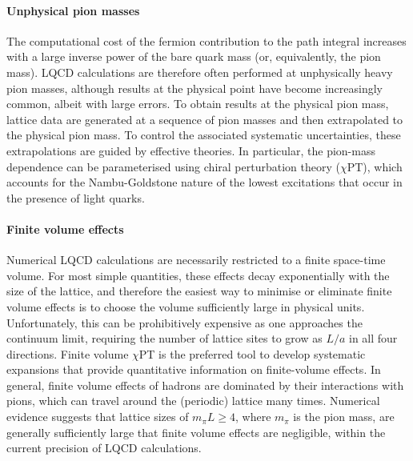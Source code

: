 \paragraph{Unphysical pion masses} 
The computational cost of the fermion contribution to the path
integral increases with a large inverse power of the bare quark mass
(or, equivalently, the pion mass). LQCD calculations are therefore
often performed at unphysically heavy pion masses, although results at
the physical point have become increasingly common, albeit with large
errors. To obtain results at the physical pion mass, lattice data are
generated at a sequence of pion masses and then extrapolated to the
physical pion mass. To control the associated systematic
uncertainties, these extrapolations are guided by effective
theories. In particular, the pion-mass dependence can be parameterised
using chiral perturbation theory ($\chi$PT), which accounts for the
Nambu-Goldstone nature of the lowest excitations that occur in the
presence of light quarks.

\paragraph{Finite volume effects} Numerical LQCD 
calculations are necessarily restricted to a finite space-time
volume. For most simple quantities, these effects decay exponentially
with the size of the lattice, and therefore the easiest way to
minimise or eliminate finite volume effects is to choose the volume
sufficiently large in physical units. Unfortunately, this can be
prohibitively expensive as one approaches the continuum limit, requiring the
number of lattice sites to grow as $L/a$ in all four directions. Finite volume $\chi$PT is the preferred
tool to develop systematic expansions that provide quantitative
information on finite-volume effects. In general, finite volume
effects of hadrons are dominated by their interactions with pions,
which can travel around the (periodic) lattice many times. Numerical
evidence suggests that lattice sizes of $m_\pi L \geq 4$, where
$m_\pi$ is the pion mass, are generally sufficiently large that finite
volume effects are negligible, within the current precision of LQCD
calculations.

